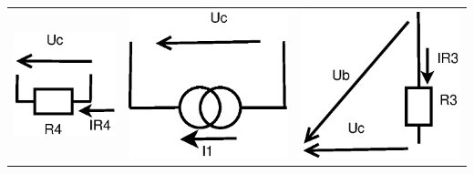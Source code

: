 \documentclass[a4paper, 12pt]{article}
\begin{document}
\begin{tabular}{|c|c|c|}
    \includegraphics[scale=0.5]{pr3/cc_14.eps}
    & 
    \includegraphics[scale=0.5]{pr3/cc_15.eps}
    & 
    \includegraphics[scale=0.5]{pr3/cc_16.eps}

\end{tabular}
\end{document}
